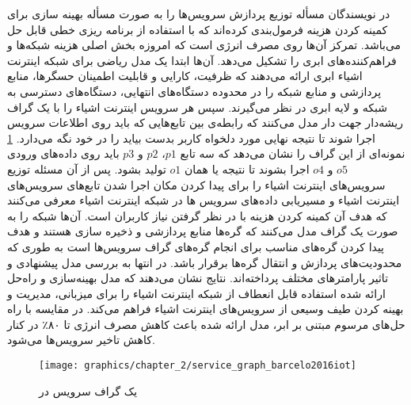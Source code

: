     در \cite{barcelo2016iot} نویسندگان مسأله توزیع پردازش سرویس‌ها‌ را به صورت مسأله بهینه سازی برای کمینه کردن هزینه فرمول‌بندی کرده‌اند که با استفاده از برنامه ریزی خطی قابل حل می‌باشد.
    تمرکز آن‌ها روی مصرف انرژی است که امروزه بخش اصلی هزینه شبکه‌ها و فراهم‌کننده‌های ابری را تشکیل می‌دهد.
    آن‌ها ابتدا یک مدل ریاضی برای شبکه اینترنت اشیاء ابری ارائه می‌دهند که ظرفیت، کارایی و قابلیت اطمینان حسگر‌ها، منابع پردازشی و منابع شبکه را در محدوده دستگاه‌های انتهایی، دستگاه‌های دسترسی به شبکه و لایه ابری در نظر می‌گیرند.
    سپس هر سرویس اینترنت اشیاء را با یک گراف ریشه‌دار جهت دار مدل می‌کنند که رابطه‌ی بین تابع‌هایی که باید روی اطلاعات سرویس اجرا شوند تا نتیجه نهایی مورد دلخواه کاربر بدست بیاید را در خود نگه می‌دارد.
    \cref{fig:chapter_2:service_graph_barcelo2016iot} نمونه‌ای از این گراف را نشان می‌دهد که سه تابع $p1$، $p2$ و $p3$ باید روی داده‌های ورودی $o5$ و $o4$ اجرا بشوند تا نتیجه یا همان $o1$ تولید بشود.
    پس از آن مسئله توزیع سرویس‌های اینترنت اشیاء را برای پیدا کردن مکان اجرا شدن تابع‌های سرویس‌های اینترنت اشیاء و مسیریابی داده‌های سرویس ها در شبکه اینترنت اشیاء معرفی می‌کنند که هدف آن کمینه کردن هزینه با در نظر گرفتن نیاز کاربران است.
    آن‌ها شبکه را به صورت یک گراف مدل می‌کنند که گره‌ها منابع پردازشی و ذخیره سازی هستند و هدف پیدا کردن گره‌های مناسب برای انجام گره‌های گراف‌ سرویس‌ها است به طوری که محدودیت‌های پردازش و انتقال گره‌ها برقرار باشد.
    در انتها به بررسی مدل پیشنهادی و تاثیر پارامتر‌های مختلف پرداخته‌اند. 
    نتایج نشان می‌دهند که مدل بهینه‌سازی و راه‌حل ارائه شده استفاده قابل انعطاف از شبکه اینترنت اشیاء را برای میزبانی، مدیریت و بهینه کردن طیف وسیعی از سرویس‌های اینترنت اشیاء فراهم می‌کند.
    در مقایسه با راه حل‌های مرسوم مبتنی بر ابر، مدل ارائه شده باعث کاهش مصرف انرژی تا ۸۰٪ در کنار کاهش تاخیر سرویس‌ها می‌شود.

    \begin{figure}[h]
      \centerline{\texttt{[image: graphics/chapter\_2/service\_graph\_barcelo2016iot]}}
      \caption{یک گراف سرویس در \cite{barcelo2016iot}}
      \label{fig:chapter_2:service_graph_barcelo2016iot}
    \end{figure}

